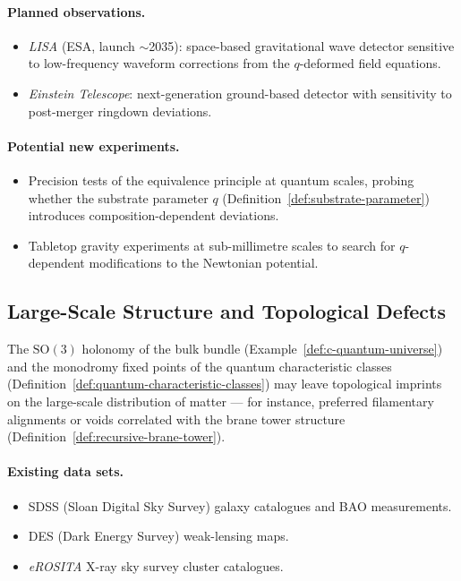 \paragraph{Planned observations.}
\begin{itemize}
  \item \emph{LISA} (ESA, launch $\sim$2035): space-based gravitational
        wave detector sensitive to low-frequency waveform corrections from the
        $q$-deformed field equations.
  \item \emph{Einstein Telescope}: next-generation ground-based detector
        with sensitivity to post-merger ringdown deviations.
\end{itemize}

\paragraph{Potential new experiments.}
\begin{itemize}
  \item Precision tests of the equivalence principle at quantum scales,
        probing whether the substrate parameter $q$
        (Definition~\ref{def:substrate-parameter}) introduces
        composition-dependent deviations.
  \item Tabletop gravity experiments at sub-millimetre scales to search for
        $q$-dependent modifications to the Newtonian potential.
\end{itemize}

\subsection{Large-Scale Structure and Topological Defects}
\label{sec:large-scale-structure}

\begin{remark}
\label{rem:topological-defects}
The $\mathrm{SO}(3)$ holonomy of the bulk bundle
(Example~\ref{def:c-quantum-universe}) and the monodromy fixed points of the
quantum characteristic classes (Definition~\ref{def:quantum-characteristic-classes})
may leave topological imprints on the large-scale distribution of matter --- for
instance, preferred filamentary alignments or voids correlated with the brane
tower structure (Definition~\ref{def:recursive-brane-tower}).
\end{remark}

\paragraph{Existing data sets.}
\begin{itemize}
  \item SDSS (Sloan Digital Sky Survey) galaxy catalogues and BAO
        measurements.
  \item DES (Dark Energy Survey) weak-lensing maps.
  \item \emph{eROSITA} X-ray sky survey cluster catalogues.
\end{itemize}

